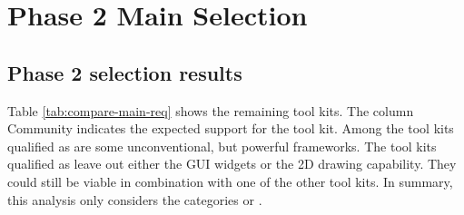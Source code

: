 \section{Phase 2 Main Selection}

\subsection{Phase 2 selection results}

Table \ref{tab:compare-main-req} shows the remaining tool kits. The column {\sc
Community} indicates the expected support for the tool kit. Among the tool kits
qualified as  are some unconventional, but powerful frameworks.  The
tool kits qualified as  leave out either the GUI widgets or the 2D
drawing capability. They could still be viable in combination with one of the
other tool kits. In summary, this analysis only considers the categories
 or .

